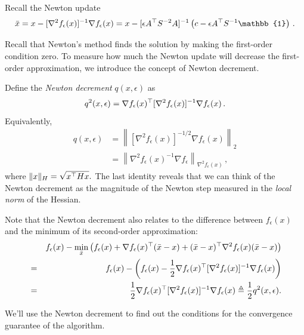 Recall the Newton update
\begin{equation}
\bar{x}=x-[\nabla^2f_\epsilon(x)]^{-1}\nabla f_\epsilon(x)=x-[\epsilon A^\trans
S^{-2}A]^{-1}\left(c-\epsilon A^\trans S^{-1}\mathbb{1}\right)\,.\label{eq:Newton_update}
\end{equation}

Recall that Newton's method finds the solution by making the first-order condition zero. To measure how much the Newton update will decrease the first-order approximation, we introduce the concept of Newton decrement.

Define the \emph{Newton decrement} $q(x,\epsilon)$ as
\begin{equation}
q^2(x, \epsilon) = \nabla f_\epsilon(x)^\top[\nabla^2f_\epsilon(x)]^{-1}\nabla
f_\epsilon(x)\label{eq:newton_decrement}\,.
\end{equation}
Equivalently,
\begin{align*}
q(x, \epsilon) 
&= \left\|[\nabla^2f_\epsilon(x)]^{-1/2}\nabla f_\epsilon(x)\right\|_2\\
&= \left\|\nabla^2f_\epsilon(x)^{-1}\nabla f_\epsilon\right\|_{\nabla^2
f_\epsilon(x)}\,,
\end{align*}
where $\|x\|_H=\sqrt{x^\top H x}.$ The last identity reveals that we can think
of the Newton decrement as the magnitude of the Newton step measured in the
\emph{local norm} of the Hessian.

Note that the Newton decrement also relates to the difference between $f_\epsilon(x)$ and the minimum of its second-order approximation:
\begin{eqnarray}
&&f_\epsilon(x)-\min_{\bar{x}}\left(f_\epsilon(x)+\nabla f_\epsilon(x)^\top(\bar{x}-x)+(\bar{x}-x)^\top\nabla^2 f_\epsilon(x)(\bar{x}-x)\right)\nonumber\\
&=&f_\epsilon(x)-\left(f_\epsilon(x)-\dfrac{1}{2}\nabla f_\epsilon(x)^\top[\nabla^2f_\epsilon(x)]^{-1}\nabla f_\epsilon(x)\right)\nonumber\\
&=&\dfrac{1}{2}\nabla f_\epsilon(x)^\top[\nabla^2f_\epsilon(x)]^{-1}\nabla f_\epsilon(x)\triangleq \dfrac{1}{2}q^2(x, \epsilon).
\end{eqnarray}

We'll use the Newton decrement to find out the conditions for the convergence
guarantee of the algorithm. 

